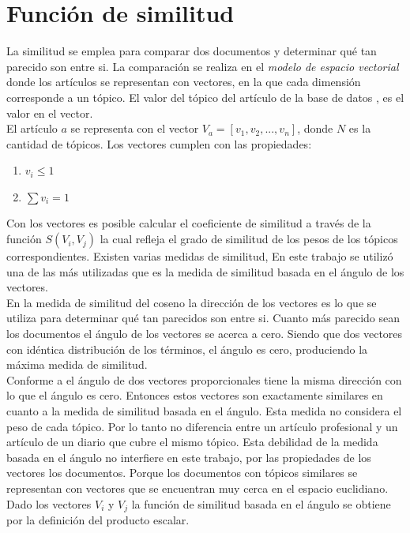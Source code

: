 \section{Función de similitud}
La similitud se emplea para comparar dos documentos y determinar qué tan parecido son entre si. La comparación se realiza en el \textit{modelo de espacio vectorial} donde los artículos se representan con vectores, en la que cada dimensión corresponde a un tópico. El valor del tópico del artículo de la base de datos \cite{dataDrive}, es el valor en el vector.\\
El artículo $a$ se representa con el vector $V_a = [v_1,v_2,...,v_n]$, donde $N$ es la cantidad de tópicos. Los vectores cumplen con las propiedades:
\begin{enumerate}
 \item $v_i \leqslant 1$
 \item $\sum{v_i} = 1$
\end{enumerate}

Con los vectores es posible calcular el coeficiente de similitud a través de la función $ S (V_i, V_j)$ la cual refleja el grado de similitud de los pesos de los tópicos correspondientes. Existen varias medidas de similitud, En este trabajo se utilizó una de las más utilizadas que es la medida de similitud basada en el ángulo de los vectores.\\
En la medida de similitud del coseno la dirección de los vectores es lo que se utiliza para determinar qué tan parecidos son entre si. Cuanto más parecido sean los documentos el ángulo de los vectores se acerca a cero. Siendo que dos vectores con idéntica distribución de los términos, el ángulo es cero, produciendo la máxima medida de similitud.\\
Conforme a \cite{newSimilarity} el ángulo de dos vectores proporcionales tiene la misma dirección con lo que el ángulo es cero. Entonces estos vectores son exactamente similares en cuanto a la medida de similitud basada en el ángulo. Esta medida no considera el peso de cada tópico. Por lo tanto no diferencia entre un artículo profesional y un artículo de un diario que cubre el mismo tópico. Esta debilidad de la medida basada en el ángulo no interfiere en este trabajo, por las propiedades de los vectores los documentos. Porque los documentos con tópicos similares se representan con vectores que se encuentran muy cerca en el espacio euclidiano. Dado los vectores $V_i$ y $V_j$ la función de similitud basada en el ángulo se obtiene por la definición del producto escalar.\\

